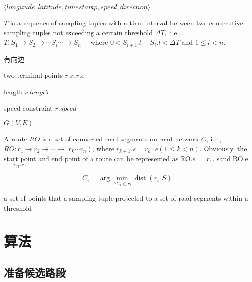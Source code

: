 \begin{definition}
    $\langle longitude, latitude, timestamp, speed,direction \rangle$
\end{definition}

\begin{definition}
    $ T $ is a sequence of sampling tuples with a time interval between two consecutive sampling tuples not exceeding a certain threshold $ \Delta T,  $ i.e., $ T: S_{1} \longrightarrow S_{2} \longrightarrow \cdots S_{i} \cdots \longrightarrow S_{n} \quad $ where $ 0<S_{i+1} . t-S_{i} . t<\Delta T $ and $ 1 \leq i<n . $ 
\end{definition}

\begin{definition}
    有向边

    two terminal points $r.s, r.e$

    length $r.length$

    speed constraint $r.speed$
\end{definition}

\begin{definition}
    $G(V,E)$
\end{definition}

\begin{definition}[route]
    A route $RO$ is a set of connected road segments on road network $ G $, i.e., $ R O: r_{1} \longrightarrow r_{2} \longrightarrow \cdots \longrightarrow $ $ \left.r_{k} \cdots r_{n}\right) $, where $ r_{k+1} . s=r_{k} \cdot e(1 \leq k<n) $. Obviously, the start point and end point of a route can be represented as RO.s $ =r_{1} . $ sand RO.e $ =r_{n} . e . $
\end{definition}

\begin{definition}
    $$ C_{i}=\arg \min _{\forall C_{i} \in r_{i}} \operatorname{dist}\left(r_{i}, S\right) $$
\end{definition}

\begin{definition}
    a set of points that a sampling tuple projected to a set of road segments within a threshold
\end{definition}

\section{算法}

\subsection{准备候选路段}

